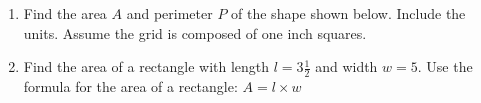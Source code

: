 \documentclass[12pt, twoside]{article}
\begin{document}
\begin{enumerate}
\item Find the area $A$ and perimeter $P$ of the shape shown below. Include the units. Assume the grid is composed of one inch squares.
  \begin{flushleft}
  \end{flushleft}

\item Find the area of a rectangle with length $l=3 \frac{1}{2}$ and width $w=5$. Use the formula for the area of a rectangle: $A = l \times w$
  \begin{flushright}
  \end{flushright}


\end{enumerate}
\end{document}
